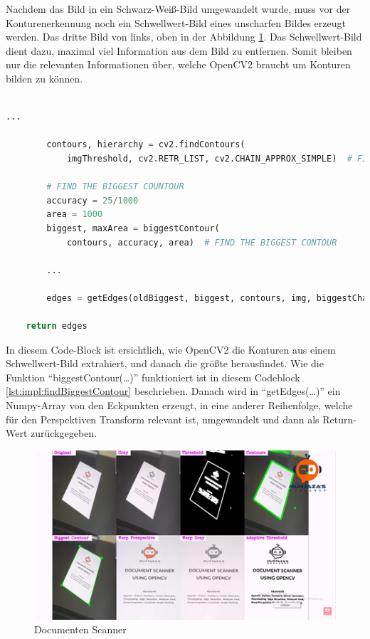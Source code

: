 Nachdem das Bild in ein Schwarz-Weiß-Bild umgewandelt wurde, muss vor der Konturenerkennung noch ein Schwellwert-Bild eines unscharfen Bildes erzeugt werden.
Das dritte Bild von links, oben in der Abbildung \ref{fig:map:documentscanner}. Das Schwellwert-Bild dient dazu, maximal viel Information aus dem Bild zu entfernen. Somit bleiben nur die relevanten Informationen über, welche OpenCV2 braucht um Konturen bilden zu können.\\
\\
\begin{lstlisting}[caption=Erhalten von Konturen,language=Python,label=lst:impl:getContours]
        ...

        contours, hierarchy = cv2.findContours(
            imgThreshold, cv2.RETR_LIST, cv2.CHAIN_APPROX_SIMPLE)  # FIND ALL CONTOURS

        # FIND THE BIGGEST COUNTOUR
        accuracy = 25/1000
        area = 1000
        biggest, maxArea = biggestContour(
            contours, accuracy, area)  # FIND THE BIGGEST CONTOUR

        ...

        edges = getEdges(oldBiggest, biggest, contours, img, biggestChanged)

    return edges
\end{lstlisting}

In diesem Code-Block ist ersichtlich, wie OpenCV2 die Konturen aus einem Schwellwert-Bild extrahiert,
und danach die größte herausfindet.
Wie die Funktion ``biggestContour(\dots)'' funktioniert ist in diesem Codeblock \ref{lst:impl:findBiggestContour} beschrieben. Danach wird in ``getEdges(\dots)'' ein Numpy-Array von den Eckpunkten erzeugt, in eine anderer Reihenfolge, welche für den Perspektiven Transform relevant ist, umgewandelt und dann als Return-Wert zurückgegeben.

\begin{figure}[H]
    \centering
    \includegraphics[scale=1]{pics/maperkennung/documentscanner.png}
    \caption{Documenten Scanner}
    \label{fig:map:documentscanner}
\end{figure}

